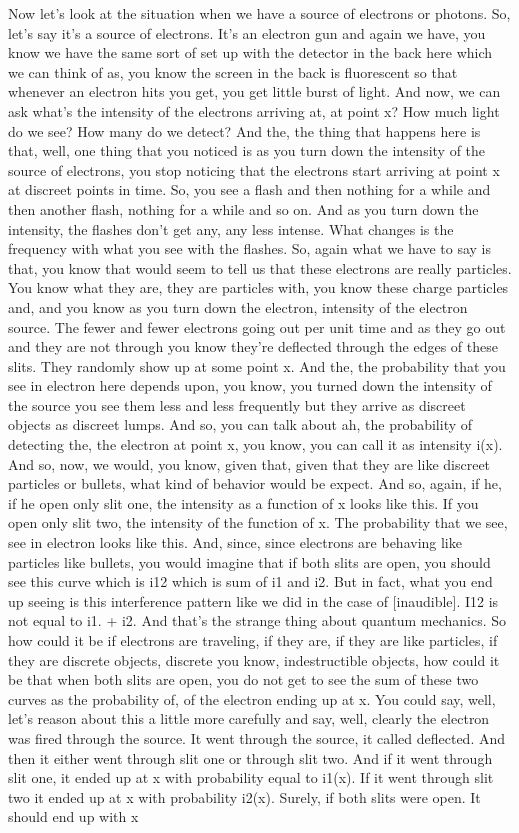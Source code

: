 \documentclass{article}
\newcommand{\<}{\langle}
\renewcommand{\>}{\rangle}
\begin{document}
Now let's look at the situation when we have a source of electrons or photons. So, let's say it's a source of electrons. It's an electron gun and again we have, you know we have the same sort of set up with the detector in the back here which we can think of as, you know the screen in the back is fluorescent so that whenever an electron hits you get, you get little burst of light. And now, we can ask what's the intensity of the electrons arriving at, at point x? How much light do we see? How many do we detect? And the, the thing that happens here is that, well, one thing that you noticed is as you turn down the intensity of the source of electrons, you stop noticing that the electrons start arriving at point x at discreet points in time. So, you see a flash and then nothing for a while and then another flash, nothing for a while and so on. And as you turn down the intensity, the flashes don't get any, any less intense. What changes is the frequency with what you see with the flashes. So, again what we have to say is that, you know that would seem to tell us that these electrons are really particles. You know what they are, they are particles with, you know these charge particles and, and you know as you turn down the electron, intensity of the electron source. The fewer and fewer electrons going out per unit time and as they go out and they are not through you know they're deflected through the edges of these slits. They randomly show up at some point x. And the, the probability that you see in electron here depends upon, you know, you turned down the intensity of the source you see them less and less frequently but they arrive as discreet objects as discreet lumps. And so, you can talk about ah, the probability of detecting the, the electron at point x, you know, you can call it as intensity i(x). And so, now, we would, you know, given that, given that they are like discreet particles or bullets, what kind of behavior would be expect. And so, again, if he, if he open only slit one, the intensity as a function of x looks like this. If you open only slit two, the intensity of the function of x. The probability that we see, see in electron looks like this. And, since, since electrons are behaving like particles like bullets, you would imagine that if both slits are open, you should see this curve which is i12 which is sum of i1 and i2. But in fact, what you end up seeing is this interference pattern like we did in the case of [inaudible]. I12 is not equal to i1. + i2. And that's the strange thing about quantum mechanics. So how could it be if electrons are traveling, if they are, if they are like particles, if they are discrete objects, discrete you know, indestructible objects, how could it be that when both slits are open, you do not get to see the sum of these two curves as the probability of, of the electron ending up at x. You could say, well, let's reason about this a little more carefully and say, well, clearly the electron was fired through the source. It went through the source, it called deflected. And then it either went through slit one or through slit two. And if it went through slit one, it ended up at x with probability equal to i1(x). If it went through slit two it ended up at x with probability i2(x). Surely, if both slits were open. It should end up with x 
\end{document}
